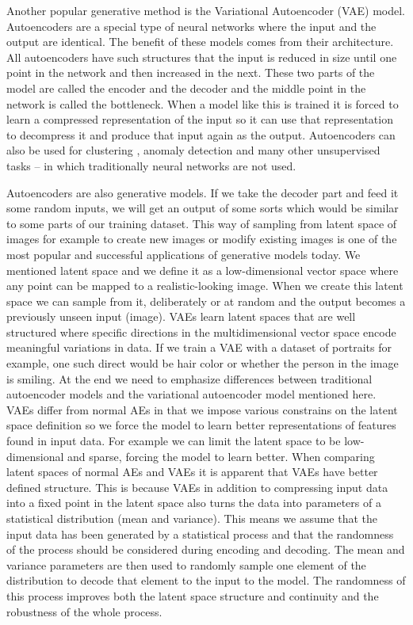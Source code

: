 \documentclass[b5paper]{book}
\let\cite\parencite
\begin{document}
Another popular generative method is the Variational Autoencoder (VAE) \cite{chollet2018deep} model. Autoencoders are a special type of neural networks where the input and the output are identical. The benefit of these models comes from their architecture. All autoencoders have such structures that the input is reduced in size until one point in the network and then increased in the next. These two parts of the model are called the encoder and the decoder and the middle point in the network is called the bottleneck. When a model like this is trained it is forced to learn a compressed representation of the input so it can use that representation to decompress it and produce that input again as the output. Autoencoders can also be used for clustering \cite{chollet2018deep}, anomaly detection \cite{an2015variational} and many other unsupervised tasks -- in which traditionally neural networks are not used. 

Autoencoders are also generative models. \cite{kusner2017grammar} \cite{pu2016variational} If we take the decoder part and feed it some random inputs, we will get an output of some sorts which would be similar to some parts of our training dataset. This way of sampling from latent space of images for example to create new images or modify existing images is one of the most popular and successful applications of generative models today. We mentioned latent space and we define it as a low-dimensional vector space where any point can be mapped to a realistic-looking image. When we create this latent space we can sample from it, deliberately or at random and the output becomes a previously unseen input (image). VAEs learn latent spaces that are well structured where specific directions in the multidimensional vector space encode meaningful variations in data. If we train a VAE with a dataset of portraits for example, one such direct would be hair color or whether the person in the image is smiling. \cite{hou2017deep} At the end we need to emphasize differences between traditional autoencoder models and the variational autoencoder model mentioned here. VAEs differ from normal AEs in that we impose various constrains on the latent space definition so we force the model to learn better representations of features found in input data. For example we can limit the latent space to be low-dimensional and sparse, forcing the model to learn better. When comparing latent spaces of normal AEs and VAEs it is apparent that VAEs have better defined structure. This is because VAEs in addition to compressing input data into a fixed point in the latent space also turns the data into parameters of a statistical distribution (mean and variance). This means we assume that the input data has been generated by a statistical process and that the randomness of the process should be considered during encoding and decoding. The mean and variance parameters are then used to randomly sample one element of the distribution to decode that element to the input to the model. The randomness of this process improves both the latent space structure and continuity and the robustness of the whole process.
\end{document}
